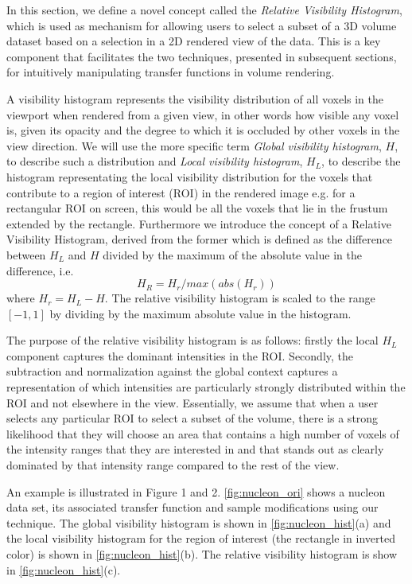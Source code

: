 \documentclass[twoside,twocolumn,10pt]{article}
\begin{document}
In this section, we define a novel concept called the \emph{Relative Visibility Histogram}, which is used as mechanism for allowing users to select a subset of a 3D volume dataset based on a selection in a 2D rendered view of the data. This is a key component that facilitates the two techniques, presented in subsequent sections, for intuitively manipulating transfer functions in volume rendering.

A visibility histogram \cite{correa_visibility_2011} represents the visibility distribution of all voxels in the viewport when rendered from a given view, in other words how visible any voxel is, given its opacity and the degree to which it is occluded by other voxels in the view direction. We will use the more specific term \emph{Global visibility histogram}, $ H $, to describe such a distribution and  \emph{Local visibility histogram}, $ H_{L} $,  to describe the histogram representating the local visibility distribution for the voxels that contribute to a region of interest (ROI) in the rendered image e.g. for a rectangular ROI on screen, this would be all the voxels that lie in the frustum extended by the rectangle. Furthermore we introduce the concept of a Relative Visibility Histogram, derived from the former which is defined as the difference between $ H_{L} $ and $ H $ divided by the maximum of the absolute value in the difference, i.e.
\[
H_{R}=H_{r}/max(abs(H_{r}))
\]
where $ H_{r}=H_{L}-H$.
The relative visibility histogram is scaled to the range $ [-1,1] $ by dividing by the maximum absolute value in the histogram. 

The purpose of the relative visibility histogram is as follows: firstly the local $ H_L $ component captures the dominant intensities in the  ROI. Secondly, the subtraction and normalization against the global context captures a representation of which intensities are particularly strongly distributed within the ROI and not elsewhere in the view. Essentially, we assume that when a user selects any particular ROI to select a subset of the volume, there is a strong likelihood that they will choose an area that contains a high number of voxels of the intensity ranges that they are interested in and that stands out as clearly dominated by that intensity range compared to the rest of the view. 


An example is illustrated in Figure 1 and 2.
\autoref{fig:nucleon_ori} shows a nucleon data set, its associated transfer function and sample modifications using our technique.
The global visibility histogram is shown in 
\autoref{fig:nucleon_hist}(a) and the local visibility histogram for the region of interest (the rectangle in inverted color) is shown in \autoref{fig:nucleon_hist}(b). The relative visibility histogram
is show in \autoref{fig:nucleon_hist}(c).
\end{document}
